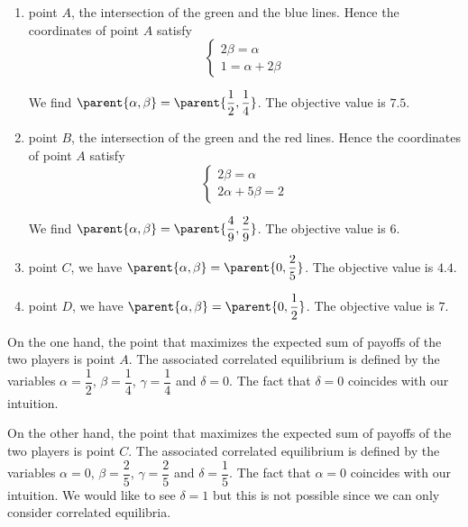 \begin{enumerate}
    \item point $A$, the intersection of the green and the blue lines. Hence the coordinates of point $A$ satisfy
    \begin{equation*}
       \begin{cases}
        2 \beta = \alpha  \\
        1 = \alpha + 2 \beta
        \end{cases} 
    \end{equation*}
    
    We find $\parent{\alpha, \beta} = \parent{\dfrac{1}{2}, \dfrac{1}{4}}$. The objective value is $7.5$.
    
    \item point $B$, the intersection of the green and the red lines. Hence the coordinates of point $A$ satisfy
    \begin{equation*}
       \begin{cases}
        2 \beta = \alpha  \\
        2 \alpha + 5 \beta = 2
        \end{cases} 
    \end{equation*}
    
    We find $\parent{\alpha, \beta} = \parent{\dfrac{4}{9}, \dfrac{2}{9}}$. The objective value is $6$.
    
    \item point $C$, we have $\parent{\alpha, \beta} = \parent{0, \dfrac{2}{5}}$. The objective value is $4.4$.
    
    \item point $D$, we have $\parent{\alpha, \beta} = \parent{0, \dfrac{1}{2}}$. The objective value is $7$.
\end{enumerate}

On the one hand, the point that maximizes the expected sum of payoffs of the two players is point $A$. The associated correlated equilibrium is defined by the variables $\alpha = \dfrac{1}{2}$, $\beta = \dfrac{1}{4}$, $\gamma = \dfrac{1}{4}$ and $\delta = 0$. The fact that $\delta = 0$ coincides with our intuition. 



On the other hand, the point that maximizes the expected sum of payoffs of the two players is point $C$. The associated correlated equilibrium is defined by the variables $\alpha = 0$, $\beta = \dfrac{2}{5}$, $\gamma = \dfrac{2}{5}$ and $\delta = \dfrac{1}{5}$. The fact that $\alpha = 0$ coincides with our intuition. We would like to see $\delta = 1$ but this is not possible since we can only consider correlated equilibria.
